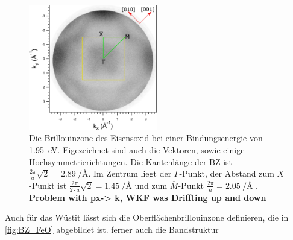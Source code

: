         \begin{figure}
            \centering
            \includegraphics[width=0.5\textwidth]{./content/pictures/FeO/BZ_FeO.png}
            \caption{Die Brillouinzone des Eisensoxid bei einer Bindungsenergie von \SI{1.95}{\electronvolt}.
            Eigezeichnet sind auch die Vektoren, sowie einige Hochsymmetrierichtungen.
            Die Kantenlänge der BZ ist $\frac{2\pi}{a}\sqrt{2} = \SI[per-mode=reciprocal]{2.89}{\per\angstrom}$.
            Im Zentrum liegt der $\overline{\Gamma}$-Punkt, der Abstand zum $\overline{X}$-Punkt ist $\frac{2\pi}{2 \cdot a}\sqrt{2} = \SI[per-mode=reciprocal]{1.45}{\per\angstrom}$ und zum $\overline{M}$-Punkt $\frac{2\pi}{a} = \SI[per-mode=reciprocal]{2.05}{\per\angstrom}$ \cite{Hüfner}.
            \textbf{Problem with px-> k, WKF was Driffting up and down}}
            \label{fig:BZ_FeO}
        \end{figure}
        Auch für das Wüstit lässt sich die Oberflächenbrillouinzone definieren, die in \autoref{fig:BZ_FeO} abgebildet ist.
        ferner auch die Bandstruktur

